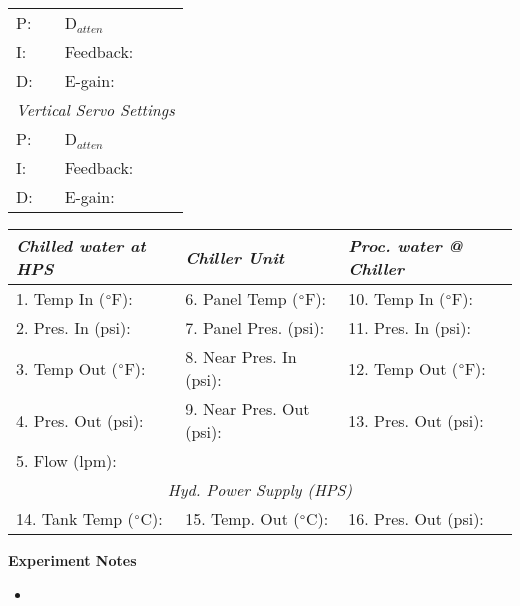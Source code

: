 \documentclass[letterpaper, 10pt]{article}
\begin{document}
\begin{table}[!ht]
	\footnotesize
	\renewcommand{\arraystretch}{1.1}
	\begin{tabular}{ p{1cm}|p{2cm} } \rowcolor[HTML]{EFEFEF}
	    \multicolumn{2}{c}{\textit{Horizontal Servo Settings} \cellcolor[HTML]{EFEFEF}} \\ \hline
	    P: & D$_{atten}$  \\ \hline
	    I: & Feedback: \\ \hline
	    D: & E-gain: \\ \hline
	    \multicolumn{2}{c}{\textit{Vertical Servo Settings} \cellcolor[HTML]{EFEFEF}} \\ \hline
	    P: & D$_{atten}$  \\ \hline
	    I: & Feedback: \\ \hline
	    D: & E-gain: \\ \hline
	\end{tabular}
	\hfill
	\renewcommand{\arraystretch}{1.1}
	\begin{tabular}{ l|l|l } \rowcolor[HTML]{EFEFEF}
	    \textit{Chilled water at HPS} & \textit{Chiller Unit} & \textit{Proc. water @ Chiller}\\ \hline
	    1. Temp In ($\degree$F): & 6. Panel Temp ($\degree$F):  & 10. Temp In ($\degree$F): \\ \hline
	    2. Pres. In (psi): & 7. Panel Pres. (psi): & 11. Pres. In (psi): \\ \hline
	    3. Temp Out ($\degree$F): & 8. Near Pres. In (psi): & 12. Temp Out ($\degree$F): \\ \hline
	    4. Pres. Out (psi): & 9. Near Pres. Out (psi): & 13. Pres. Out (psi): \\ \hline
	    5. Flow (lpm): \\ \hline
	    \multicolumn{3}{c}{\textit{Hyd. Power Supply (HPS)} \cellcolor[HTML]{EFEFEF}} \\ \hline
	    14. Tank Temp ($\degree$C): & 15. Temp. Out ($\degree$C): & 16. Pres. Out (psi): \\ \hline
	\end{tabular}
\end{table} \vspace{-0.5cm}


\newpage 
 \textbf{Experiment Notes}
 \medskip
 {\small \begin{itemize}[label=\#]
 \setlength\itemsep{0.25em}
 	 \item 
 \end{itemize}} 

 
\end{document}
